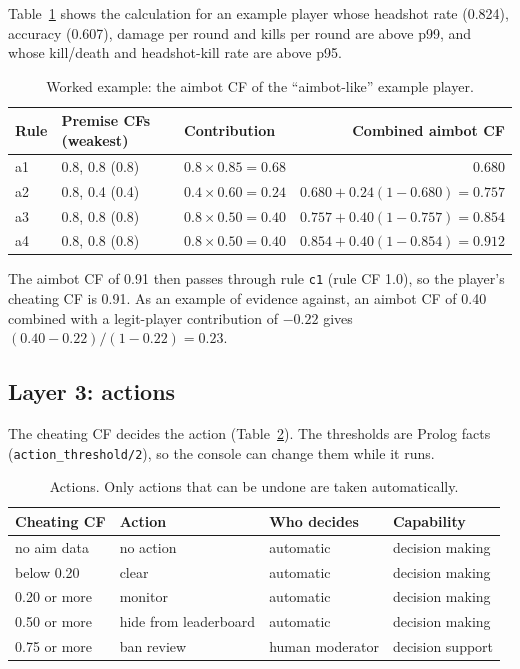 \documentclass[11pt,a4paper]{article}
\newcommand{\code}[1]{\texttt{#1}}
\begin{document}
Table~\ref{tab:cfexample} shows the calculation for an example player whose headshot rate (0.824),
accuracy (0.607), damage per round and kills per round are above p99, and whose kill/death and
headshot-kill rate are above p95.

\begin{table}[H]
\centering
\small
\caption{Worked example: the aimbot CF of the ``aimbot-like'' example player.}
\label{tab:cfexample}
\begin{tabular}{lllr}
\toprule
Rule & Premise CFs (weakest) & Contribution & Combined aimbot CF \\
\midrule
a1 & 0.8, 0.8 (0.8) & $0.8 \times 0.85 = 0.68$ & 0.680 \\
a2 & 0.8, 0.4 (0.4) & $0.4 \times 0.60 = 0.24$ & $0.680 + 0.24(1-0.680) = 0.757$ \\
a3 & 0.8, 0.8 (0.8) & $0.8 \times 0.50 = 0.40$ & $0.757 + 0.40(1-0.757) = 0.854$ \\
a4 & 0.8, 0.8 (0.8) & $0.8 \times 0.50 = 0.40$ & $0.854 + 0.40(1-0.854) = 0.912$ \\
\bottomrule
\end{tabular}
\end{table}

The aimbot CF of 0.91 then passes through rule \code{c1} (rule CF 1.0), so the player's cheating CF
is 0.91. As an example of evidence against, an aimbot CF of 0.40 combined with a legit-player
contribution of $-0.22$ gives $(0.40-0.22)/(1-0.22) = 0.23$.

\subsection{Layer 3: actions}
The cheating CF decides the action (Table~\ref{tab:actions}). The thresholds are Prolog facts
(\code{action\_threshold/2}), so the console can change them while it runs.

\begin{table}[H]
\centering
\small
\caption{Actions. Only actions that can be undone are taken automatically.}
\label{tab:actions}
\begin{tabular}{llll}
\toprule
Cheating CF & Action & Who decides & Capability \\
\midrule
no aim data & no action & automatic & decision making \\
below 0.20 & clear & automatic & decision making \\
0.20 or more & monitor & automatic & decision making \\
0.50 or more & hide from leaderboard & automatic & decision making \\
0.75 or more & ban review & human moderator & decision support \\
\bottomrule
\end{tabular}
\end{table}
\end{document}
